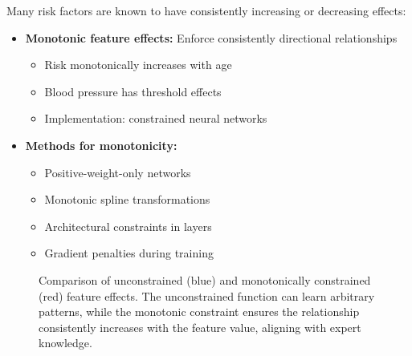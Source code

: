 Many risk factors are known to have consistently increasing or decreasing effects:

\begin{itemize}
    \item \textbf{Monotonic feature effects:} Enforce consistently directional relationships
    \begin{itemize}
        \item Risk monotonically increases with age
        \item Blood pressure has threshold effects
        \item Implementation: constrained neural networks
    \end{itemize}

    \item \textbf{Methods for monotonicity:}
    \begin{itemize}
        \item Positive-weight-only networks
        \item Monotonic spline transformations
        \item Architectural constraints in layers
        \item Gradient penalties during training
    \end{itemize}
\end{itemize}

\begin{figure}[htbp]
    \centering
    \caption{Comparison of unconstrained (blue) and monotonically constrained (red) feature effects. The unconstrained function can learn arbitrary patterns, while the monotonic constraint ensures the relationship consistently increases with the feature value, aligning with expert knowledge.}
    \label{fig:monotonic-constraints}
\end{figure}

